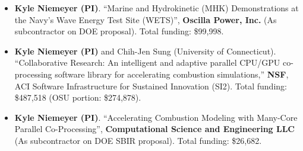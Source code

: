 \documentclass[margin,line,11pt]{res}
\begin{document}
\begin{resume}
\begin{itemize}[leftmargin=*]
\item \textbf{Kyle Niemeyer (PI)}. ``Marine and Hydrokinetic (MHK) Demonstrations at the Navy's Wave Energy Test Site (WETS)'', \textbf{Oscilla Power, Inc.} (As subcontractor on DOE proposal). Total funding: \$99,998.

\item \textbf{Kyle Niemeyer (PI)} and Chih-Jen Sung (University of Connecticut). ``Collaborative Research: An intelligent and adaptive parallel CPU\slash GPU co-processing software library for accelerating combustion simulations,'' \textbf{NSF}, ACI Software Infrastructure for Sustained Innovation (SI2). Total funding: \$487,518 (OSU portion: \$274,878).

\item \textbf{Kyle Niemeyer (PI)}. ``Accelerating Combustion Modeling with Many-Core Parallel Co-Pro\-cessing'', \textbf{Computational Science and Engineering LLC} (As subcontractor on DOE SBIR proposal). Total funding: \$26,682.

\end{itemize}

\end{resume}
\end{document}
